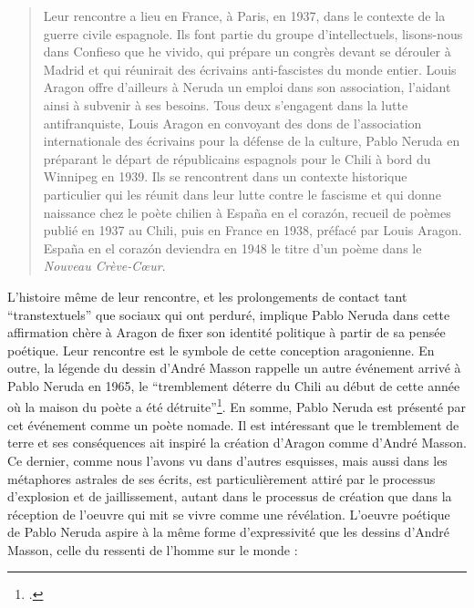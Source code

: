 \begin{quote}
Leur rencontre a lieu en France, à Paris, en 1937, dans le contexte de la guerre civile espagnole. Ils font partie du groupe d’intellectuels, lisons-nous dans Confieso que he vivido, qui prépare un congrès devant se dérouler à Madrid et qui réunirait des écrivains anti-fascistes du monde entier. Louis Aragon offre d’ailleurs à Neruda un emploi dans son association, l’aidant ainsi à subvenir à ses besoins. Tous deux s’engagent dans la lutte antifranquiste, Louis Aragon en convoyant des dons de l’association internationale des écrivains pour la défense de la culture, Pablo Neruda en préparant le départ de républicains espagnols pour le Chili à bord du Winnipeg en 1939. Ils se rencontrent dans un contexte historique particulier qui les réunit dans leur lutte contre le fascisme et qui donne naissance chez le poète chilien à España en el corazón, recueil de poèmes publié en 1937 au Chili, puis en France en 1938, préfacé par Louis Aragon. España en el corazón deviendra en 1948 le titre d’un poème dans le \emph{Nouveau Crève-Cœur}.	
\end{quote}	 



L’histoire même de leur rencontre, et les prolongements de contact tant \enquote{transtextuels} que sociaux qui ont perduré, implique Pablo Neruda dans cette affirmation chère à Aragon de fixer son identité politique à partir de sa pensée poétique. Leur rencontre est le symbole de cette conception aragonienne. En outre, la légende du dessin d’André Masson rappelle un autre événement arrivé à Pablo Neruda en 1965, le \enquote{tremblement déterre du Chili au début de cette année où la maison du poète a été détruite}\footcite{pabloneruda}. En somme, Pablo Neruda est présenté par cet événement comme un poète nomade. Il est intéressant que le tremblement de terre et ses conséquences ait inspiré la création d’Aragon comme d’André Masson. Ce dernier, comme nous l’avons vu dans d’autres esquisses, mais aussi dans les métaphores astrales de ses écrits, est particulièrement attiré par le processus d’explosion et de jaillissement, autant dans le processus de création que dans la réception de l’oeuvre qui mit se vivre comme une révélation. L’oeuvre poétique de Pablo Neruda aspire à la même forme d’expressivité que les dessins d’André Masson, celle du ressenti de l’homme sur le monde :

